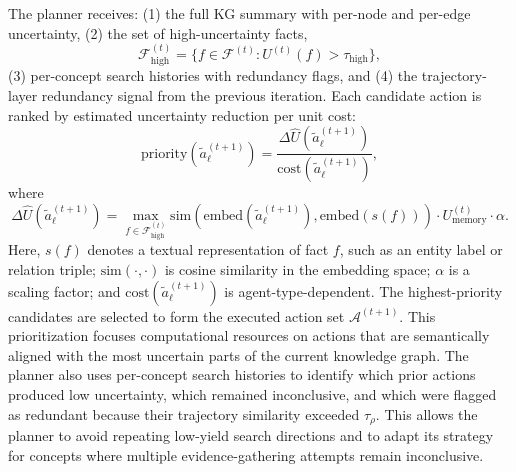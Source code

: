 \documentclass{article}
\begin{document}
The planner receives: (1) the full KG summary with per-node and per-edge uncertainty, (2) the set of high-uncertainty facts,
\[
\mathcal{F}_{\text{high}}^{(t)}
=
\{f \in \mathcal{F}^{(t)} : U^{(t)}(f) > \tau_{\text{high}}\},
\]
(3) per-concept search histories with redundancy flags, and (4) the trajectory-layer redundancy signal from the previous iteration. Each candidate action is ranked by estimated uncertainty reduction per unit cost:
\begin{equation}
\text{priority}\!\left(\tilde{a}_\ell^{(t+1)}\right)
=
\frac{
\Delta \hat{U}\!\left(\tilde{a}_\ell^{(t+1)}\right)
}{
\text{cost}\!\left(\tilde{a}_\ell^{(t+1)}\right)
},
\end{equation}
where
\begin{equation}
\Delta \hat{U}\!\left(\tilde{a}_\ell^{(t+1)}\right)
=
\max_{f \in \mathcal{F}_{\text{high}}^{(t)}}
\text{sim}
\left(
\text{embed}\!\left(\tilde{a}_\ell^{(t+1)}\right),
\text{embed}\!\left(s(f)\right)
\right)
\cdot
U_{\text{memory}}^{(t)}
\cdot
\alpha .
\end{equation}
Here, $s(f)$ denotes a textual representation of fact $f$, such as an entity label or relation triple; $\text{sim}(\cdot,\cdot)$ is cosine similarity in the embedding space; $\alpha$ is a scaling factor; and $\text{cost}(\tilde{a}_\ell^{(t+1)})$ is agent-type-dependent. The highest-priority candidates are selected to form the executed action set $\mathcal{A}^{(t+1)}$.
This prioritization focuses computational resources on actions that are semantically aligned with the most uncertain parts of the current knowledge graph. The planner also uses per-concept search histories to identify which prior actions produced low uncertainty, which remained inconclusive, and which were flagged as redundant because their trajectory similarity exceeded $\tau_{\rho}$. This allows the planner to avoid repeating low-yield search directions and to adapt its strategy for concepts where multiple evidence-gathering attempts remain inconclusive.
\end{document}
